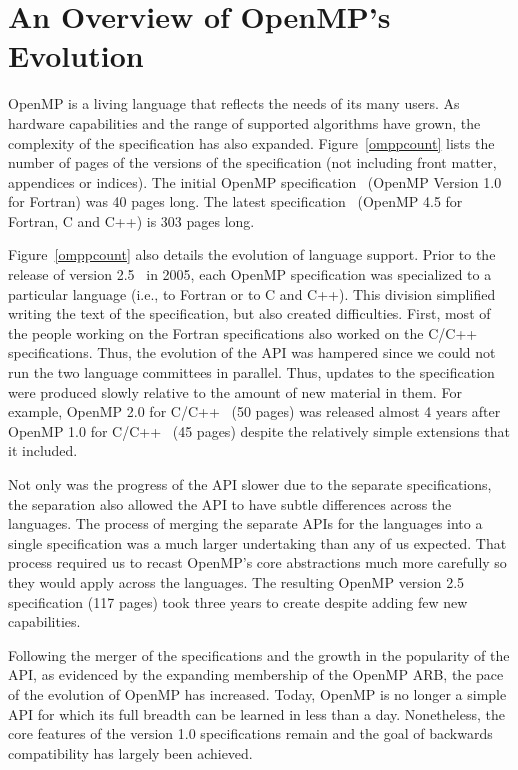 \section{An Overview of OpenMP's Evolution}
\label{sec:evolve}

OpenMP is a living language that reflects the needs of its many users. 
As hardware capabilities and the range of supported algorithms have 
grown, the complexity of the specification has also expanded. 
Figure~\ref{omppcount} lists the number of pages of the versions of 
the specification (not including front matter, appendices or indices).   
The initial OpenMP specification~\cite{openmp1f} (OpenMP Version 1.0 for
Fortran) was 40 pages long. The latest specification~\cite{openmp45} (OpenMP 4.5
for Fortran, C and C++) is 303 pages long.

Figure~\ref{omppcount} also details the evolution of language support.
Prior to the release of version 2.5~\cite{openmp25} in 2005, each OpenMP specification 
was specialized to a particular language (i.e., to Fortran or to C and 
C++). This division simplified writing the text of the specification, 
but also created difficulties. First, most of the people working on the 
Fortran specifications also worked on the C/C++ specifications. Thus, the 
evolution of the API was hampered since we could not run the two 
language committees in parallel. Thus, updates to the specification 
were produced slowly relative to the amount of new material in them. For
example, OpenMP 2.0 for C/C++~\cite{openmp2c} (50 pages) was released almost 4
years after OpenMP 1.0 for C/C++~\cite{openmp1c} (45 pages) despite the
relatively simple extensions that it included. 

Not only was the progress of the API slower due to the separate 
specifications, the separation also allowed the API to have subtle 
differences across the languages. The process of merging the separate
APIs for the languages into a single  specification was a much larger 
undertaking than any of us expected. That process required us to recast 
OpenMP's core abstractions much more carefully so they would apply across 
the languages. The resulting OpenMP version 2.5 specification (117 pages)
took three years to create despite adding few new capabilities.

Following the merger of the specifications and the growth in the popularity
of the API, as evidenced by the expanding membership of the OpenMP ARB,
the pace of the evolution of OpenMP has increased. Today, OpenMP is no 
longer a simple API for which its full breadth can be learned in less 
than a day. Nonetheless, the core features of the version 1.0 specifications
remain and the goal of backwards compatibility has largely been achieved.

